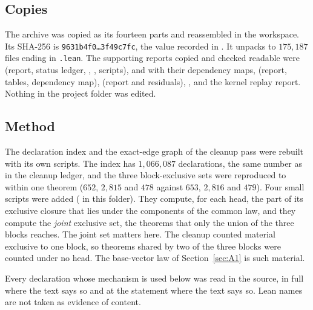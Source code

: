 \documentclass[11pt]{article}
\theoremstyle{definition}
\theoremstyle{remark}
\begin{document}
\subsection{Copies}
The archive  was copied as its fourteen parts and reassembled in the workspace. Its SHA-256 is \texttt{9631b4f0\ldots 3f49c7fc}, the value recorded in . It unpacks to $175{,}187$ files ending in \texttt{.lean}. The supporting reports copied and checked readable were  (report, status ledger, , , scripts),  and  with their dependency maps,  (report, tables, dependency map),  (report and residuals), ,  and the kernel replay report. Nothing in the project folder was edited.

\subsection{Method}
The declaration index and the exact-edge graph of the cleanup pass were rebuilt with its own scripts. The index has $1{,}066{,}087$ declarations, the same number as in the cleanup ledger, and the three block-exclusive sets were reproduced to within one theorem ($652$, $2{,}815$ and $478$ against $653$, $2{,}816$ and $479$). Four small scripts were added ( in this folder). They compute, for each head, the part of its exclusive closure that lies under the components of the common law, and they compute the \emph{joint} exclusive set, the theorems that only the union of the three blocks reaches. The joint set matters here. The cleanup counted material exclusive to one block, so theorems shared by two of the three blocks were counted under no head. The base-vector law of Section~\ref{sec:A1} is such material.

Every declaration whose mechanism is used below was read in the source, in full where the text says so and at the statement where the text says so. Lean names are not taken as evidence of content.
\end{document}
